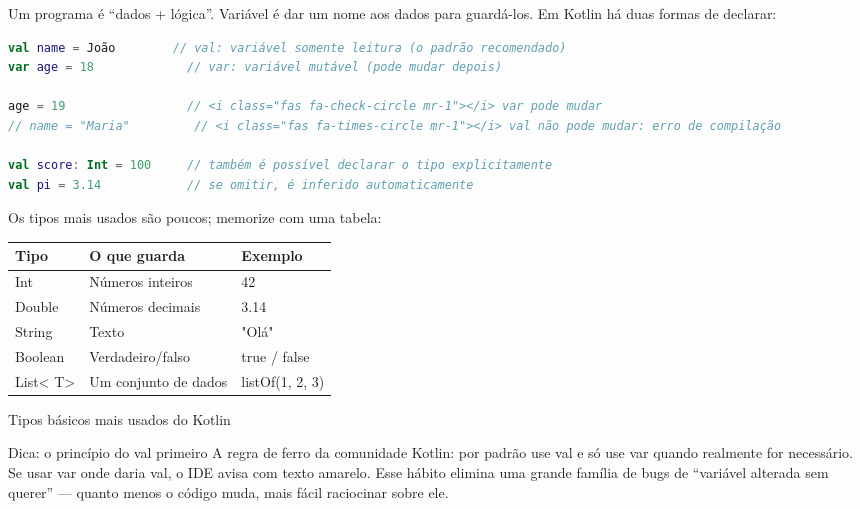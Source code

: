 


Um programa é “dados + lógica”. Variável é dar um nome aos dados para guardá-los. Em Kotlin há duas formas de declarar:

\begin{lstlisting}[language=Kotlin]
val name = João        // val: variável somente leitura (o padrão recomendado)
var age = 18             // var: variável mutável (pode mudar depois)

age = 19                 // <i class="fas fa-check-circle mr-1"></i> var pode mudar
// name = "Maria"         // <i class="fas fa-times-circle mr-1"></i> val não pode mudar: erro de compilação

val score: Int = 100     // também é possível declarar o tipo explicitamente
val pi = 3.14            // se omitir, é inferido automaticamente
\end{lstlisting}

Os tipos mais usados são poucos; memorize com uma tabela:

\begin{center}
\begin{tabularx}{\linewidth}{|X|X|X|}
\hline
\textbf{Tipo} & \textbf{O que guarda} & \textbf{Exemplo} \tabularnewline
\hline
Int & Números inteiros & 42 \tabularnewline
Double & Números decimais & 3.14 \tabularnewline
String & Texto & "Olá" \tabularnewline
Boolean & Verdadeiro/falso & true / false \tabularnewline
List< T> & Um conjunto de dados & listOf(1, 2, 3) \tabularnewline
\hline
\end{tabularx}
\end{center}

\begin{center}\small\color{gray}Tipos básicos mais usados do Kotlin\end{center}

\begin{tcbinfo}{Dica: o princípio do val primeiro}
A regra de ferro da comunidade Kotlin: por padrão use val e só use var quando realmente for necessário. Se usar var onde daria val, o IDE avisa com texto amarelo. Esse hábito elimina uma grande família de bugs de “variável alterada sem querer” — quanto menos o código muda, mais fácil raciocinar sobre ele.

\end{tcbinfo}

